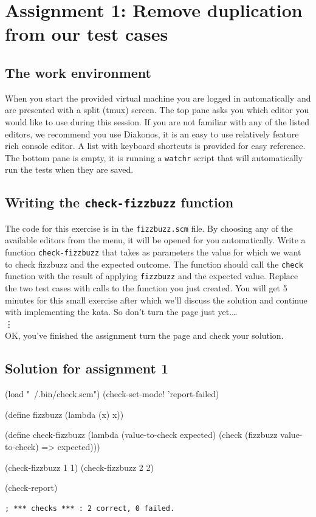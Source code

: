 \documentclass[12pt,a4paper,english,twoside]{article}
\begin{document}
\section{Assignment 1: Remove duplication from our test cases}
\subsection{The work environment}
When you start the provided virtual machine you are logged in automatically 
and are presented with a split (tmux) screen. The top pane asks you which 
editor you would like to use during this session. If you are not familiar with 
any of the listed editors, we recommend you use Diakonos, it is an easy to use 
relatively feature rich console editor. A list with keyboard shortcuts is 
provided for easy reference. The bottom pane is empty, it is running a 
\texttt{watchr} script that will automatically run the tests when they are 
saved.  
\subsection{Writing the \texttt{check-fizzbuzz} function}
The code for this exercise is in the \texttt{fizzbuzz.scm} file. By choosing 
any of the available editors from the menu, it will be opened for you 
automatically. Write a function \texttt{check-fizzbuzz} that takes as 
parameters the value for which we want to check fizzbuzz and the expected 
outcome. The function should call the \texttt{check} function with the result of 
applying \texttt{fizzbuzz} and the expected value. Replace the two test cases with 
calls to the function you just created. You will get 5 minutes for this small 
exercise after which we'll discuss the solution and continue with implementing 
the kata. So don't turn the page just yet.\ldots \\
\vdots \\
OK, you've finished the assignment turn the page and check your solution.
\vfill
\pagebreak
\subsection{Solution for assignment 1}
\begin{schemecode}
(load "~/.bin/check.scm")
(check-set-mode! 'report-failed)

(define fizzbuzz (lambda (x) x))

(define check-fizzbuzz 
  (lambda (value-to-check expected)
    (check (fizzbuzz value-to-check) => expected)))

(check-fizzbuzz 1 1)
(check-fizzbuzz 2 2)

(check-report)
\end{schemecode}
\begin{lstlisting}
; *** checks *** : 2 correct, 0 failed.  
\end{lstlisting}
\end{document}
